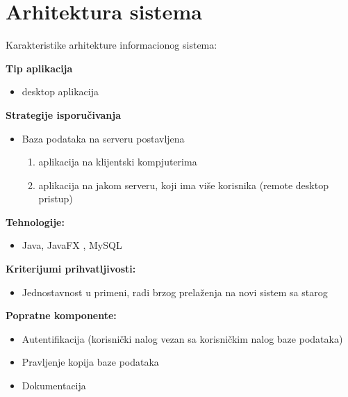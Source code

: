 \section{Arhitektura sistema}

Karakteristike arhitekture informacionog sistema:

\textbf{Tip aplikacija}
\begin{itemize}
\item desktop aplikacija
\end{itemize}

\textbf{Strategije isporučivanja}
\begin{itemize}
\item Baza podataka na serveru postavljena
\begin{enumerate}
\item aplikacija na klijentski kompjuterima
\item aplikacija na jakom serveru, koji ima više korisnika (remote desktop pristup)
\end{enumerate}
\end{itemize}

\textbf{Tehnologije:}
\begin{itemize}
\item Java, JavaFX , MySQL
\end{itemize}

\textbf{Kriterijumi prihvatljivosti:}
\begin{itemize}
\item Jednostavnost u primeni, radi brzog prelaženja na novi sistem sa starog
\end{itemize}

\textbf{Popratne komponente:}
\begin{itemize}
\item Autentifikacija (korisnički nalog vezan sa korisničkim nalog baze podataka)
\item Pravljenje kopija baze podataka
\item Dokumentacija
\end{itemize}

\clearpage

